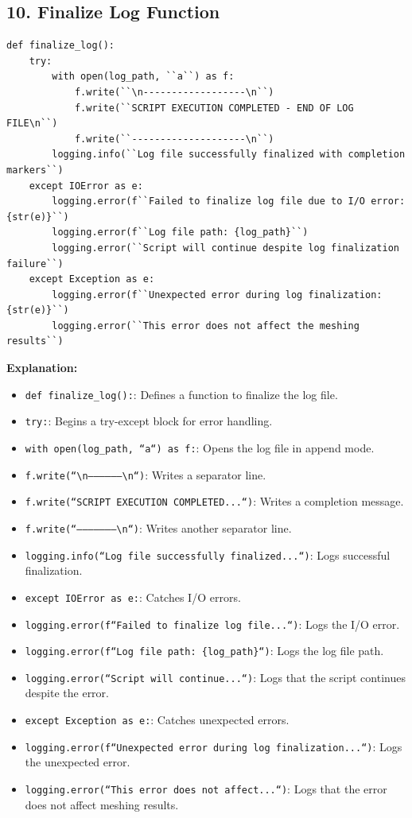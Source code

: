\documentclass{book}
\begin{document}
\begin{itemize}[leftmargin=*,label=\textbullet]
\subsection*{10. Finalize Log Function}
\begin{lstlisting}[caption={Finalize Log Function},label={lst:finalize_log}]
def finalize_log():
    try:
        with open(log_path, ``a``) as f:
            f.write(``\n------------------\n``)
            f.write(``SCRIPT EXECUTION COMPLETED - END OF LOG FILE\n``)
            f.write(``--------------------\n``)
        logging.info(``Log file successfully finalized with completion markers``)
    except IOError as e:
        logging.error(f``Failed to finalize log file due to I/O error: {str(e)}``)
        logging.error(f``Log file path: {log_path}``)
        logging.error(``Script will continue despite log finalization failure``)
    except Exception as e:
        logging.error(f``Unexpected error during log finalization: {str(e)}``)
        logging.error(``This error does not affect the meshing results``)
\end{lstlisting}
\textbf{Explanation:}
\begin{itemize}
    \item \texttt{def finalize\_log():}: Defines a function to finalize the log file.
    \item \texttt{try:}: Begins a try-except block for error handling.
    \item \texttt{with open(log\_path, ``a``) as f:}: Opens the log file in append mode.
    \item \texttt{f.write(``\textbackslash n------------------\textbackslash n``)}: Writes a separator line.
    \item \texttt{f.write(``SCRIPT EXECUTION COMPLETED...``)}: Writes a completion message.
    \item \texttt{f.write(``--------------------\textbackslash n``)}: Writes another separator line.
    \item \texttt{logging.info(``Log file successfully finalized...``)}: Logs successful finalization.
    \item \texttt{except IOError as e:}: Catches I/O errors.
    \item \texttt{logging.error(f``Failed to finalize log file...``)}: Logs the I/O error.
    \item \texttt{logging.error(f``Log file path: \{log\_path\}``)}: Logs the log file path.
    \item \texttt{logging.error(``Script will continue...``)}: Logs that the script continues despite the error.
    \item \texttt{except Exception as e:}: Catches unexpected errors.
    \item \texttt{logging.error(f``Unexpected error during log finalization...``)}: Logs the unexpected error.
    \item \texttt{logging.error(``This error does not affect...``)}: Logs that the error does not affect meshing results.
\end{itemize}


\end{itemize}
\end{document}
